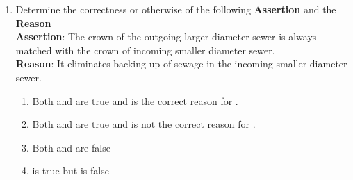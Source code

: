\documentclass[journal]{IEEEtran}
\begin{document}
\begin{enumerate}
\begin{center}
\begin{tabular}{ |l| l|}
\end{tabular}
\end{center}
	\begin{multicols}{2}
	\begin{enumerate}
		\item P-3,Q-2,R-1,S-4
		\item P-4,Q-2,R-1,S-3
		\item P-4,Q-1,R-2,S-3
		\item P-4,Q-2,R-3,S-1
	\end{enumerate}
\end{multicols}
	\item Determine the correctness or otherwise of the following \textbf{Assertion } and the \textbf{Reason }\\
\textbf{Assertion}: The crown of the outgoing larger diameter sewer is always matched with the crown of incoming smaller diameter sewer.\\
\textbf{Reason}: It eliminates backing up of sewage in the incoming smaller diameter sewer.
	\begin{multicols}{2}
	\begin{enumerate}
		\item Both  and  are true and  is the correct reason for .
		\item Both  and  are true and  is not the correct reason for .

		\item Both  and  are false
		\item  {} is true but  is false


\end{enumerate}
\end{multicols}
\end{enumerate}
\end{document}
